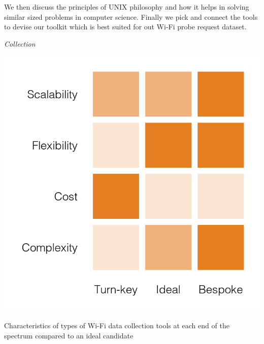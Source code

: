 We then discuss the principles of UNIX philosophy and how it helps in solving similar sized problems in computer science. Finally we pick and connect the tools to devise our toolkit which is best suited for out Wi-Fi probe request dataset.


\vspace{1.5em}\noindent\textit{Collection}\vspace{0.5em}

\begin{marginfigure}
  \includegraphics[trim={0.2cm 0 0 0},clip]{images/data-toolkit-collection.png}
  \caption{Characteristics of types of Wi-Fi data collection tools at each end of the spectrum compared to an ideal candidate  }
  \label{figure:toolkit:collection}
\end{marginfigure}


